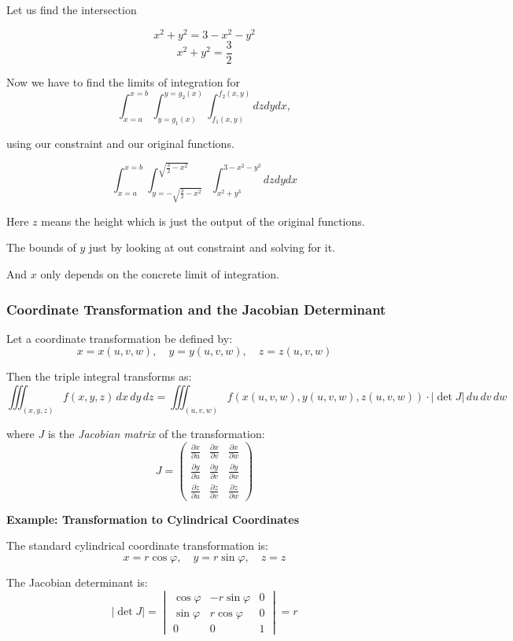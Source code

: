 Let us find the intersection

\[
x^2 + y^2 = 3 -x^2 - y^2 
\]
\[
x^2 + y^2 = \frac{3}{2}
\]

Now we have to find the limits of integration for 
\[
\int_{x=a}^{x=b}\int_{y=g_1(x)}^{y=g_2(x)} \int_{f_1(x,y)}^{f_2(x,y)} dz dy dx,
\]

using our constraint and our original functions.

\[
\int_{x=a}^{x=b}\int_{y=-\sqrt{\frac{3}{2} - x^2}}^{\sqrt{\frac{3}{2} -x^2}} \int_{x^2 + y^3}^{3-x^2-y^2} dz dy dx
\]

Here \(z\) means the height which is just the output
of the original functions.

The bounds of \(y\) just by looking at out constraint and solving for it.

And \(x\) only depends on the concrete limit of integration.


\subsubsection{Coordinate Transformation and the Jacobian Determinant}

Let a coordinate transformation be defined by:
\[
x = x(u, v, w), \quad y = y(u, v, w), \quad z = z(u, v, w)
\]

Then the triple integral transforms as:
\[
\iiint_{(x, y, z)} f(x, y, z)\, dx\, dy\, dz = \iiint_{(u, v, w)} f(x(u, v, w), y(u, v, w), z(u, v, w)) \cdot \left| \det J \right|\, du\, dv\, dw
\]

where \( J \) is the \emph{Jacobian matrix} of the transformation:
\[
J = 
\begin{pmatrix}
\frac{\partial x}{\partial u} & \frac{\partial x}{\partial v} & \frac{\partial x}{\partial w} \\
\frac{\partial y}{\partial u} & \frac{\partial y}{\partial v} & \frac{\partial y}{\partial w} \\
\frac{\partial z}{\partial u} & \frac{\partial z}{\partial v} & \frac{\partial z}{\partial w}
\end{pmatrix}
\]

\textbf{Example: Transformation to Cylindrical Coordinates}

The standard cylindrical coordinate transformation is:
\[
x = r \cos \varphi, \quad y = r \sin \varphi, \quad z = z
\]

The Jacobian determinant is:
\[
\left| \det J \right| =
\begin{vmatrix}
\cos \varphi & -r \sin \varphi & 0 \\
\sin \varphi & r \cos \varphi & 0 \\
0 & 0 & 1
\end{vmatrix}
= r
\]

